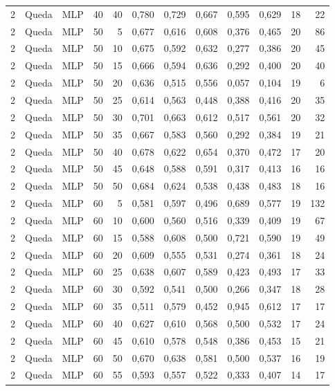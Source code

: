 \begin{longtable}{@{}rllrrrrrrrrr@{}}
2 & Queda & MLP & 40 & 40 & 0,780 & 0,729 & 0,667 & 0,595 & 0,629 & 18 & 22 \\
2 & Queda & MLP & 50 & 5 & 0,677 & 0,616 & 0,608 & 0,376 & 0,465 & 20 & 86 \\
2 & Queda & MLP & 50 & 10 & 0,675 & 0,592 & 0,632 & 0,277 & 0,386 & 20 & 45 \\
2 & Queda & MLP & 50 & 15 & 0,666 & 0,594 & 0,636 & 0,292 & 0,400 & 20 & 40 \\
2 & Queda & MLP & 50 & 20 & 0,636 & 0,515 & 0,556 & 0,057 & 0,104 & 19 & 6 \\
2 & Queda & MLP & 50 & 25 & 0,614 & 0,563 & 0,448 & 0,388 & 0,416 & 20 & 35 \\
2 & Queda & MLP & 50 & 30 & 0,701 & 0,663 & 0,612 & 0,517 & 0,561 & 20 & 32 \\
2 & Queda & MLP & 50 & 35 & 0,667 & 0,583 & 0,560 & 0,292 & 0,384 & 19 & 21 \\
2 & Queda & MLP & 50 & 40 & 0,678 & 0,622 & 0,654 & 0,370 & 0,472 & 17 & 20 \\
2 & Queda & MLP & 50 & 45 & 0,648 & 0,588 & 0,591 & 0,317 & 0,413 & 16 & 16 \\
2 & Queda & MLP & 50 & 50 & 0,684 & 0,624 & 0,538 & 0,438 & 0,483 & 18 & 16 \\
2 & Queda & MLP & 60 & 5 & 0,581 & 0,597 & 0,496 & 0,689 & 0,577 & 19 & 132 \\
2 & Queda & MLP & 60 & 10 & 0,600 & 0,560 & 0,516 & 0,339 & 0,409 & 19 & 67 \\
2 & Queda & MLP & 60 & 15 & 0,588 & 0,608 & 0,500 & 0,721 & 0,590 & 19 & 49 \\
2 & Queda & MLP & 60 & 20 & 0,609 & 0,555 & 0,531 & 0,274 & 0,361 & 18 & 24 \\
2 & Queda & MLP & 60 & 25 & 0,638 & 0,607 & 0,589 & 0,423 & 0,493 & 17 & 33 \\
2 & Queda & MLP & 60 & 30 & 0,592 & 0,541 & 0,500 & 0,266 & 0,347 & 18 & 28 \\
2 & Queda & MLP & 60 & 35 & 0,511 & 0,579 & 0,452 & 0,945 & 0,612 & 17 & 17 \\
2 & Queda & MLP & 60 & 40 & 0,627 & 0,610 & 0,568 & 0,500 & 0,532 & 17 & 24 \\
2 & Queda & MLP & 60 & 45 & 0,610 & 0,578 & 0,548 & 0,386 & 0,453 & 15 & 21 \\
2 & Queda & MLP & 60 & 50 & 0,670 & 0,638 & 0,581 & 0,500 & 0,537 & 16 & 19 \\
2 & Queda & MLP & 60 & 55 & 0,593 & 0,557 & 0,522 & 0,333 & 0,407 & 14 & 17 \\

\end{longtable}
